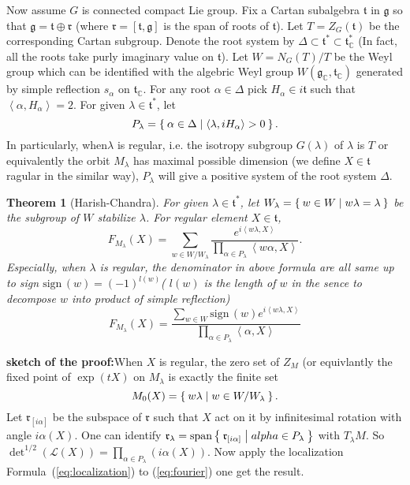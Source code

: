 \documentclass[12pt]{amsart}
\newtheorem{Thm}{Theorem}
\def\cL{{\mathcal{L}}}
\def\bC{{\mathbb{C}}}
\def\fgg{{\mathfrak{g}}}
\def\ftt{{\mathfrak{t}}}
\def\frr{{\mathfrak{r}}}
\def\sproof{{\bf sketch of the proof:}}
\def\inn#1#2{\left<{#1},{#2}\right>}
\def\sign{\mathrm{sign\,}}
\def\sspan{\mathrm{span}}
\begin{document}
Now assume $G$ is connected compact Lie group.
Fix a Cartan subalgebra $\ftt$ in $\fgg$ so that $\fgg=\ftt\oplus \frr$ (where $\frr = [\ftt,\fgg]$ is the span of roots of $\ftt$). Let $T = Z_G(\ftt)$ be the corresponding Cartan subgroup. Denote the root system by $\Delta \subset \ftt^* \subset \ftt_\bC^*$ (In fact, all the roots take purly imaginary value on $\ftt$).
Let $W = N_G(T)/T$ be the Weyl group which can be identified with the algebric Weyl group $W(\fgg_\bC,\ftt_\bC)$ generated by simple reflection $s_\alpha$ on $\ftt_\bC$. 
For any root $\alpha\in \Delta$ pick $H_\alpha \in i\ftt$ such that $\inn{\alpha}{H_\alpha}=2$.
For given $\lambda\in\ftt^*$,
let 
\begin{equation}\label{eq:positive}
P_\lambda = \Set{\alpha\in \Delta|\inn{\lambda}{iH_\alpha}>0}.
\end{equation}
In particularly, when$\lambda$ is regular, i.e. 
the isotropy subgroup $G(\lambda)$ of $\lambda$ is $T$ 
or equivalently the orbit $M_\lambda$ has maximal possible dimension (we define $X\in \ftt$ ragular in the similar way), $P_\lambda$ will give a positive system of the root system $\Delta$.

\begin{Thm}[Harish-Chandra]
For given $\lambda\in \ftt^*$, let $W_\lambda = \Set{w\in W|w\lambda = \lambda}$
be the subgroup of $W$ stabilize $\lambda$. For regular element $X\in \ftt$, 
\begin{equation}\label{eq:fourier}
F_{M_\lambda}(X) = \sum_{w\in W/W_\lambda}\frac{e^{i\inn{w\lambda}{X}}}{
\prod_{\alpha\in P_\lambda}\inn{w\alpha}{X}}. 
\end{equation}
Especially, when $\lambda$ is regular, the denominator in above formula are 
all same up to sign $\sign(w) = (-1)^{l(w)}$( $l(w)$ is the length of $w$ in the sence to decompose $w$ into product of simple reflection)
\begin{equation}
\label{eq:harish1}
F_{M_\lambda}(X) = \frac{\sum_{w\in W} \sign(w)e^{i\inn{w\lambda}{X}}}{\prod_{\alpha\in P_\lambda}\inn{\alpha}{X}}
\end{equation}
\end{Thm}
\sproof When $X$ is regular, the zero set of $Z_M$
(or equivlantly the fixed point of $\exp(tX)$ on $M_\lambda$ is exactly
the finite set 
\[
M_0(X) = \Set{w\lambda|w\in W/W_\lambda}.
\]
Let $\frr_{[i\alpha]}$ be the subspace of $\frr$ 
such that $X$ act on it by infinitesimal rotation with angle $i\alpha(X)$.
One can identify $\frr_\lambda = \sspan\Set{\frr_{[i\alpha]}|alpha \in P_\lambda}$ 
with $T_\lambda M$. So $\det^{1/2}(\cL(X)) = \prod_{\alpha\in P_\lambda}(i\alpha(X))$.
Now apply the localization Formula~(\ref{eq:localization}) 
to (\ref{eq:fourier}) one get the result.
\end{document}
